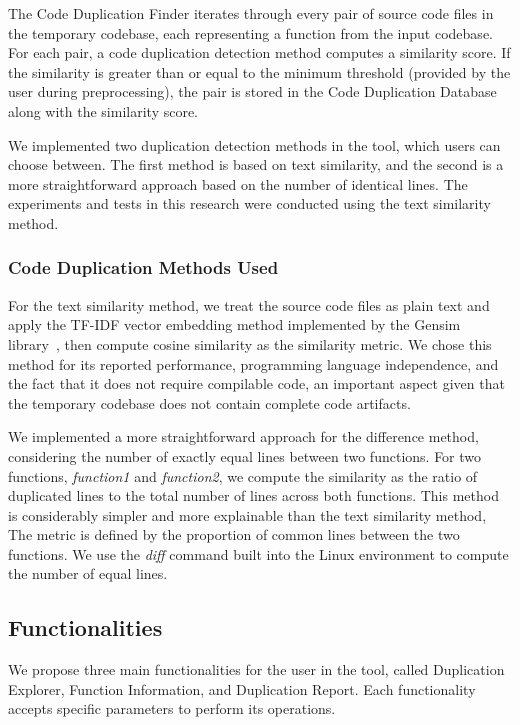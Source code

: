 \documentclass[conference]{IEEEtran}
\begin{document}
The Code Duplication Finder iterates through every pair of source code files in the
temporary codebase, each representing a function from the input codebase. For each pair,
a code duplication detection method computes a similarity score. If the similarity is greater 
than or equal to the minimum threshold (provided by the user during preprocessing), the pair 
is stored in the Code Duplication Database along with the similarity score.

We implemented two duplication detection methods in the tool, which users can choose 
between. The first method is based on text similarity, and the second is a more straightforward approach 
based on the number of identical lines. The experiments and tests in this research were 
conducted using the text similarity method.


\subsubsection{Code Duplication Methods Used}

For the text similarity method, we treat the source code files as plain text and apply the
TF-IDF vector embedding method implemented by the Gensim library~\cite{gensim},
then compute cosine similarity as the similarity metric. We chose this method for 
its reported performance, programming language independence, and the fact that it does 
not require compilable code, an important aspect given that the
temporary codebase does not contain complete code artifacts.

We implemented a more straightforward approach for the difference method,
considering the number of exactly equal lines between two functions.
For two functions, \textit{function1} and \textit{function2}, we compute the similarity as the 
ratio of duplicated lines to the total number of lines across both functions.
This method is considerably simpler and more explainable than the text similarity method, 
The metric is defined by the proportion of common lines between the two functions. 
We use the \textit{diff} command built into the Linux environment to compute the number of equal lines.

\subsection{Functionalities}

We propose three main functionalities for the user in the tool, called Duplication
Explorer, Function Information, and Duplication Report. Each functionality accepts
specific parameters to perform its operations.
\end{document}
